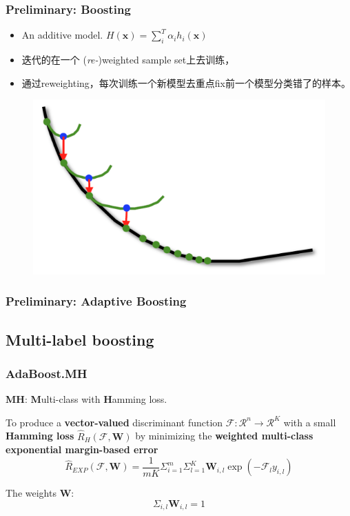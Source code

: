 \documentclass{beamer}
\begin{document}
\begin{frame}
\frametitle{Preliminary: Boosting}
\begin{itemize}
\item An additive model. $H(\mathbf{x}) = \sum_i^T \alpha_i h_i(\mathbf{x})$
\item 迭代的在一个 (\textit{re-})weighted sample set上去训练，
\item 通过reweighting，每次训练一个新模型去重点fix前一个模型分类错了的样本。
\end{itemize}

\begin{figure}
\includegraphics[width=.5\linewidth]{img/boosting.png}
\end{figure}
\end{frame}

\begin{frame}
\frametitle{Preliminary: Adaptive Boosting}

\begin{algorithm}[H]
\end{algorithm}

\end{frame}

\subsection{Multi-label boosting}

\begin{frame}
\frametitle{AdaBoost.MH}
\begin{block}{}
\textbf{MH}: \textbf{M}ulti-class with \textbf{H}amming loss.
\end{block}
To produce a \textbf{vector-valued} discriminant function $\mathcal{F} : \mathcal{R}^n \rightarrow \mathcal{R}^K$ with a small \textbf{Hamming loss} $\hat{R}_H (\mathcal{F}, \mathbf{W})$ by minimizing the \textbf{weighted multi-class exponential margin-based error}
$$\hat{R}_{EXP}(\mathcal{F}, \mathbf{W}) = \frac{1}{mK} {{\Sigma}_{i=1}^m} {{\Sigma}_{l=1}^K} {\mathbf{W}_{i,l}\exp(- \mathcal{F}_l y_{i,l})}$$

The weights $\mathbf{W}$:
$${\Sigma}_{i,l} \mathbf{W}_{i, l} = 1$$
\end{frame}
\end{document}
